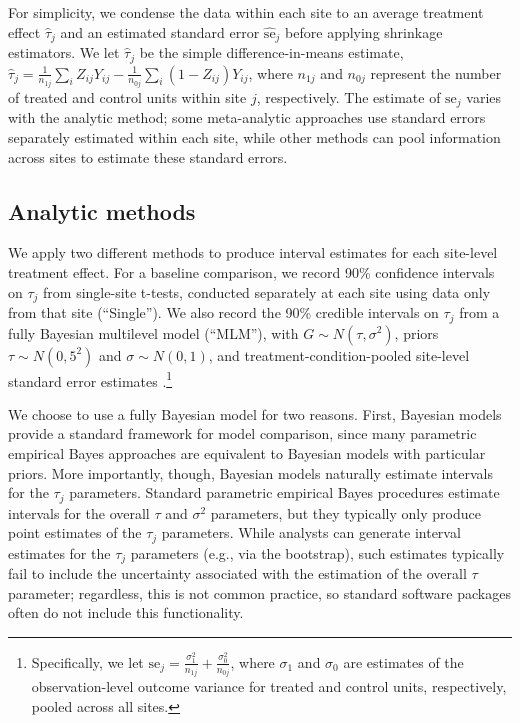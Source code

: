 \documentclass[]{article}
\begin{document}
For simplicity, we condense the data within each site to an average treatment effect $\hat{\tau}_j$ and an estimated standard error $\hat{\text{se}}_j$ before applying shrinkage estimators.
We let $\hat{\tau}_j$ be the simple difference-in-means estimate, $\hat{\tau}_j = \frac{1}{n_{1j}} \sum_i Z_{ij}Y_{ij} - \frac{1}{n_{0j}} \sum_i (1-Z_{ij})Y_{ij}$, where $n_{1j}$ and $n_{0j}$ represent the number of treated and control units within site $j$, respectively.
The estimate of $\text{se}_j$ varies with the analytic method; some meta-analytic approaches use standard errors separately estimated within each site, while other methods can pool information across sites to estimate these standard errors.

\subsection{Analytic methods}

We apply two different methods to produce interval estimates for each site-level treatment effect.
For a baseline comparison, we record 90\% confidence intervals on $\tau_j$ from single-site t-tests, conducted separately at each site using data only from that site (``Single'').
We also record the 90\% credible intervals on $\tau_j$ from a fully Bayesian multilevel model (``MLM''), with $G \sim N(\tau, \sigma^2)$, priors $\tau \sim N(0,5^2)$ and $\sigma \sim N(0,1)$, and treatment-condition-pooled site-level standard error estimates \citep{bloom2017using}.\footnote{Specifically, we let $\text{se}_j = \frac{\sigma_1^2}{n_{1j}} + \frac{\sigma_0^2}{n_{0j}}$, where $\sigma_{1}$ and $\sigma_{0}$ are estimates of the observation-level outcome variance for treated and control units, respectively, pooled across all sites.}

We choose to use a fully Bayesian model for two reasons.
First, Bayesian models provide a standard framework for model comparison, since many parametric empirical Bayes approaches are equivalent to Bayesian models with particular priors.
More importantly, though, Bayesian models naturally estimate intervals for the $\tau_j$ parameters.
Standard parametric empirical Bayes procedures estimate intervals for the overall $\tau$ and $\sigma^2$ parameters, but they typically only produce point estimates of the $\tau_j$ parameters.
While analysts can generate interval estimates for the $\tau_j$ parameters (e.g., via the bootstrap), such estimates typically fail to include the uncertainty associated with the estimation of the overall $\tau$ parameter;
regardless, this is not common practice, so standard software packages often do not include this functionality.
\end{document}
